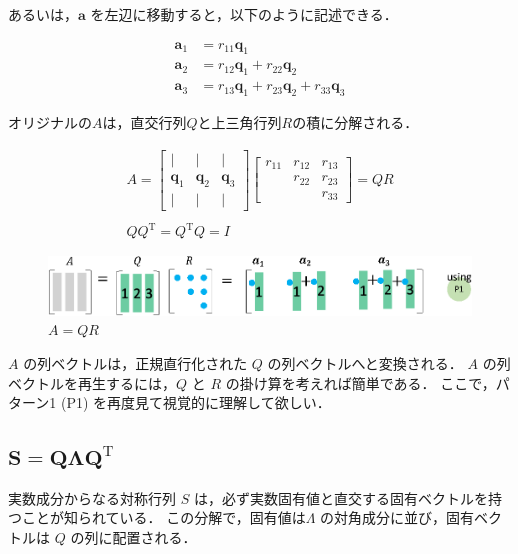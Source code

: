 \documentclass[letterpaper]{article}
\DeclareRobustCommand\transp{^{\mathrm{T}}}
\begin{document}
あるいは，$\bm{a}$ を左辺に移動すると，以下のように記述できる．

\begin{align*}
  \bm{a}_1 &= r_{11}\bm{q}_1\\
  \bm{a}_2 &= r_{12}\bm{q}_1 + r_{22} \bm{q}_2\\
  \bm{a}_3 &= r_{13}\bm{q}_1 + r_{23} \bm{q}_2 + r_{33} \bm{q}_3
\end{align*}

オリジナルの$A$は，直交行列$Q$と上三角行列$R$の積に分解される．

\begin{gather*}
  A = 
  \begin{bmatrix}
    | & | & |\\
    \bm{q}_1 & \bm{q}_2 & \bm{q}_3\\
    | & | & |
  \end{bmatrix}
  \begin{bmatrix}
    r_{11} & r_{12} & r_{13}\\
           & r_{22} & r_{23}\\
           &        & r_{33}
  \end{bmatrix} = QR\\
  \\
  Q Q\transp=Q\transp Q = I
\end{gather*}

\begin{figure}[H]
  \includegraphics[keepaspectratio, width=\linewidth]{QR-j.eps}
  \caption{$A=QR$}
\end{figure}


$A$ の列ベクトルは，正規直行化された $Q$ の列ベクトルへと変換される．
$A$ の列ベクトルを再生するには，$Q$ と $R$ の掛け算を考えれば簡単である．
ここで，パターン1 (P1) を再度見て視覚的に理解して欲しい．


\clearpage

\subsection{$\boldsymbol{S=Q \Lambda Q\transp}$}

実数成分からなる対称行列 $S$ は，必ず実数固有値と直交する固有ベクトルを持つことが知られている．
この分解で，固有値は$\Lambda$ の対角成分に並び，固有ベクトルは $Q$ の列に配置される．
\end{document}

